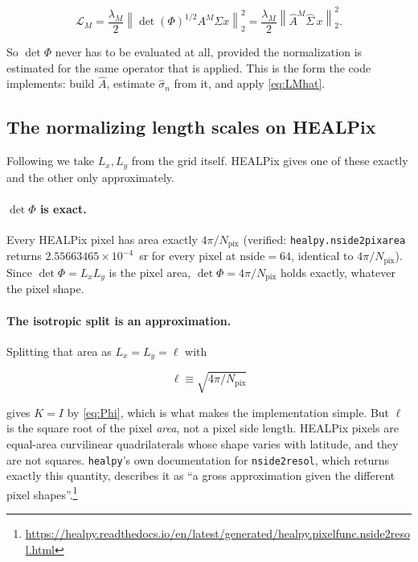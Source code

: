 \documentclass[11pt]{article}
\newcommand{\grid}{\ell}
\newcommand{\shat}{\hat{\sigma}}
\newcommand{\Ahat}{\hat{A}}
\newcommand{\Npix}{N_{\mathrm{pix}}}
\begin{document}
\begin{equation}
\label{eq:LMhat}
\mathcal{L}_M
 = \frac{\lambda_M}{2}\left\|\det(\Phi)^{1/2} A^{M} \Sigma x\right\|_2^2
 = \frac{\lambda_M}{2}\left\|\Ahat^{M}\hat{\Sigma}\, x\right\|_2^2 .
\end{equation}

So $\det\Phi$ never has to be evaluated at all, provided the normalization is estimated
for the same operator that is applied. This is the form the code implements: build
$\Ahat$, estimate $\shat_n$ from it, and apply \eqref{eq:LMhat}.

\subsection{The normalizing length scales on HEALPix}
\label{sec:lengths}

Following \citet[\S3.3]{smith2022} we take $L_x, L_y$ from the grid itself. HEALPix gives
one of these exactly and the other only approximately.

\paragraph{$\det\Phi$ is exact.} Every HEALPix pixel has area exactly $4\pi/\Npix$
(verified: \texttt{healpy.nside2pixarea} returns $2.55663465\times10^{-4}$~sr for every
pixel at $\mathrm{nside}=64$, identical to $4\pi/\Npix$). Since $\det\Phi = L_x L_y$ is
the pixel area, $\det\Phi = 4\pi/\Npix$ holds exactly, whatever the pixel shape.

\paragraph{The isotropic split is an approximation.} Splitting that area as
$L_x = L_y = \grid$ with

\begin{equation}
\label{eq:gridscale}
\grid \equiv \sqrt{4\pi/\Npix}
\end{equation}

gives $K = I$ by \eqref{eq:Phi}, which is what makes the implementation simple. But
$\grid$ is the square root of the pixel \emph{area}, not a pixel side length. HEALPix
pixels are equal-area curvilinear quadrilaterals whose shape varies with latitude, and
they are not squares. \texttt{healpy}'s own documentation for \texttt{nside2resol}, which
returns exactly this quantity, describes it as ``a gross approximation given the
different pixel shapes''.\footnote{\url{https://healpy.readthedocs.io/en/latest/generated/healpy.pixelfunc.nside2resol.html}}
\end{document}
